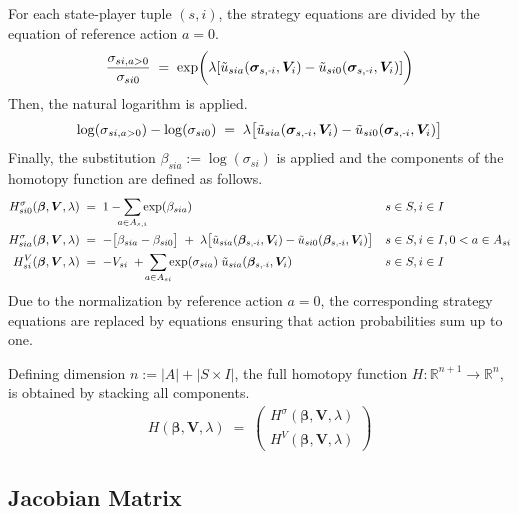 \documentclass[11pt,fleqn]{article}
\newcommand{\R}{\mathbb{R}}
\newcommand{\bsigma}{\bm{\sigma}}
\newcommand{\bbeta}{\bm{\beta}}
\newcommand{\bV}{\bm{V}}
\newcommand{\tu}{\tilde{u}}
\newcommand{\shortminus}{{\text{\scalebox{0.4}[1.0]{\(-\)}}}}
\newcommand{\minusi}{\shortminus i}
\begin{document}
For each state-player tuple $(s,i)$, the strategy equations are divided by the equation of reference action $a=0$.
\begin{align*}
	\frac{ \sigma_{si,a>0} }{ \sigma_{si0} } \;=\; \exp\biggl( \lambda [\tu_{sia}(\bsigma_{s,\minusi},\bV_i) - \tu_{si0}(\bsigma_{s,\minusi},\bV_i)] \biggr)
\end{align*}
Then, the natural logarithm is applied.
\begin{align*}
	\log(\sigma_{si,a>0}) - \log(\sigma_{si0}) \;=\; \lambda \bigl[ \tu_{sia}(\bsigma_{s,\minusi},\bV_i) - \tu_{si0}(\bsigma_{s,\minusi},\bV_i) \bigr]
\end{align*}
Finally, the substitution $\beta_{sia} := \log(\sigma_{si})$ is applied and the components of the homotopy function are defined as follows.
\begin{align*}
	H_{si0}^{\sigma}(\bbeta,\bV,\lambda) & \;=\; 1 - \sum\limits_{\mathclap{a\in A_{s,i}}} \exp(\beta_{sia}) && s\in S, i\in I \\
	H_{sia}^{\sigma}(\bbeta,\bV,\lambda) & \;=\; - \bigl[ \beta_{sia} - \beta_{si0} \bigr] \;+\; \lambda \bigl[ \tu_{sia}(\bbeta_{s,\minusi},\bV_i) - \tu_{si0}(\bbeta_{s,\minusi},\bV_i) \bigr] && s\in S, i\in I, 0<a\in A_{si} \\
	H_{si}^{V}(\bbeta,\bV,\lambda) & \;=\; - V_{si} \;+\; \sum\limits_{\mathclap{a\in A_{si}}} \exp(\sigma_{sia}) \; \tu_{sia}(\bbeta_{s,\minusi},\bV_{i}) && s\in S, i\in I
\end{align*}
Due to the normalization by reference action $a=0$, the corresponding strategy equations are replaced by equations ensuring that action probabilities sum up to one. 

Defining dimension $n := |A|+|S\times I|$, the full homotopy function $H: \R^{n+1} \rightarrow \R^n$, is obtained by stacking all components.
\begin{align*}
	H(\bbeta,\bV,\lambda) \;=\;
	\begin{pmatrix} 
		H^{\sigma}(\bbeta,\bV,\lambda) \\ 
		H^{V}(\bbeta,\bV,\lambda) 
	\end{pmatrix}
\end{align*}


\subsection*{Jacobian Matrix}
\end{document}
